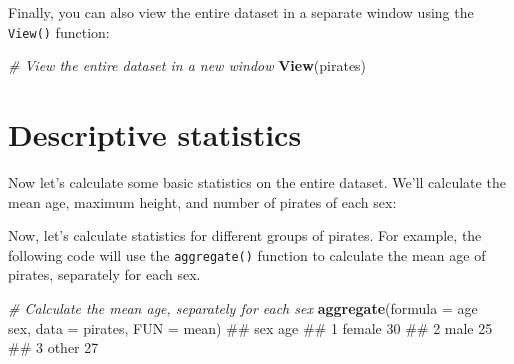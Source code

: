 \documentclass[]{book}
\newenvironment{Shaded}{\begin{snugshade}}{\end{snugshade}}
\newcommand{\KeywordTok}[1]{\textcolor[rgb]{0.13,0.29,0.53}{\textbf{{#1}}}}
\newcommand{\DataTypeTok}[1]{\textcolor[rgb]{0.13,0.29,0.53}{{#1}}}
\newcommand{\StringTok}[1]{\textcolor[rgb]{0.31,0.60,0.02}{{#1}}}
\newcommand{\CommentTok}[1]{\textcolor[rgb]{0.56,0.35,0.01}{\textit{{#1}}}}
\newcommand{\NormalTok}[1]{{#1}}
\theoremstyle{definition}
\theoremstyle{definition}
\theoremstyle{remark}
\begin{document}
Finally, you can also view the entire dataset in a separate window using
the \texttt{View()} function:

\begin{Shaded}
\begin{Highlighting}[]
\CommentTok{# View the entire dataset in a new window}
\KeywordTok{View}\NormalTok{(pirates)}
\end{Highlighting}
\end{Shaded}

\section{Descriptive statistics}\label{descriptive-statistics}

Now let's calculate some basic statistics on the entire dataset. We'll
calculate the mean age, maximum height, and number of pirates of each
sex:

\begin{Shaded}
\end{Shaded}

Now, let's calculate statistics for different groups of pirates. For
example, the following code will use the \texttt{aggregate()} function
to calculate the mean age of pirates, separately for each sex.

\begin{Shaded}
\begin{Highlighting}[]
\CommentTok{# Calculate the mean age, separately for each sex}
\KeywordTok{aggregate}\NormalTok{(}\DataTypeTok{formula =} \NormalTok{age ~}\StringTok{ }\NormalTok{sex,}
          \DataTypeTok{data =} \NormalTok{pirates,}
          \DataTypeTok{FUN =} \NormalTok{mean)}
\NormalTok{##      sex age}
\NormalTok{## 1 female  30}
\NormalTok{## 2   male  25}
\NormalTok{## 3  other  27}
\end{Highlighting}
\end{Shaded}
\end{document}
